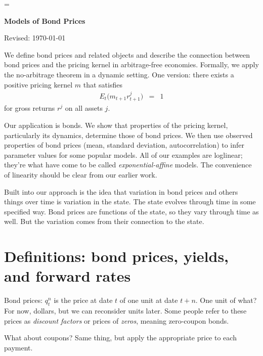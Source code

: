 \documentclass[11pt]{article}
\begin{document}
\parskip=\bigskipamount
\parindent=0.0in
\thispagestyle{empty}


\bigskip\bigskip
\centerline{\Large \bf Models of Bond Prices}
\centerline{Revised: \today}

\bigskip
We define bond prices and related objects
and describe the connection between bond prices and the
pricing kernel in arbitrage-free economies.
Formally, we apply the no-arbitrage theorem in a dynamic setting.
One version:  there exists a positive pricing kernel $m$ that satisfies
\begin{eqnarray}
    E_t \big( m_{t+1} r_{t+1}^j \big) &=& 1
    \label{eq:E(mr)=1}
\end{eqnarray}
for gross returns $r^j$ on all assets $j$.

Our application is bonds.
We show that properties of the pricing kernel,
particularly its dynamics,
determine those of bond prices.
We then use observed properties of bond prices
(mean, standard deviation, autocorrelation)
to infer parameter values for some popular models.
All of our examples are loglinear; they're what have come to be
called {\it exponential-affine\/} models.
The convenience of linearity should be clear from our earlier work.

Built into our approach is the idea that variation in
bond prices and others things over time
is variation in the state.
The state evolves through time in some specified way.
Bond prices are functions of the state,
so they vary through time as well.
But the variation comes from their connection to the state.


\section{Definitions:  bond prices, yields, and forward rates}

Bond prices:
$q^n_t$ is the price at date $t$ of one unit
at date $t+n$.
One unit of what?
For now, dollars, but we can reconsider units later.
Some people refer to these prices as {\it discount factors\/}
or prices of {\it zeros\/}, meaning zero-coupon bonds.

What about coupons?  Same thing, but apply the appropriate price
to each payment.
\end{document}
